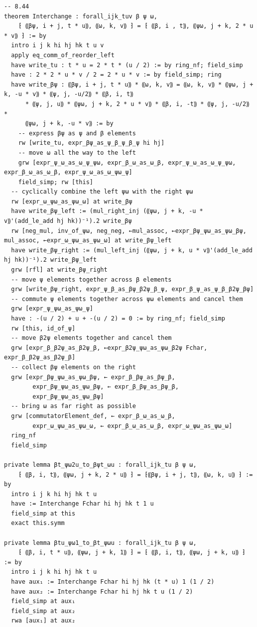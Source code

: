 \begin{Verbatim}
-- 8.44
theorem Interchange : forall_ijk_tuv β ψ ω,
    ⁅ ⸨βψ, i + j, t * u⸩, ⸨ω, k, v⸩ ⁆ = ⁅ ⸨β, i , t⸩, ⸨ψω, j + k, 2 * u * v⸩ ⁆ := by
  intro i j k hi hj hk t u v
  apply eq_comm_of_reorder_left
  have write_tu : t * u = 2 * t * (u / 2) := by ring_nf; field_simp
  have : 2 * 2 * u * v / 2 = 2 * u * v := by field_simp; ring
  have write_βψ : ⸨βψ, i + j, t * u⸩ * ⸨ω, k, v⸩ = ⸨ω, k, v⸩ * ⸨ψω, j + k, -u * v⸩ * ⸨ψ, j, -u/2⸩ * ⸨β, i, t⸩
      * ⸨ψ, j, u⸩ * ⸨ψω, j + k, 2 * u * v⸩ * ⸨β, i, -t⸩ * ⸨ψ, j, -u/2⸩ *
      ⸨ψω, j + k, -u * v⸩ := by
    -- express βψ as ψ and β elements
    rw [write_tu, expr_βψ_as_ψ_β_ψ_β_ψ hi hj]
    -- move ω all the way to the left
    grw [expr_ψ_ω_as_ω_ψ_ψω, expr_β_ω_as_ω_β, expr_ψ_ω_as_ω_ψ_ψω, expr_β_ω_as_ω_β, expr_ψ_ω_as_ω_ψω_ψ]
    field_simp; rw [this]
  -- cyclically combine the left ψω with the right ψω
  rw [expr_ω_ψω_as_ψω_ω] at write_βψ
  have write_βψ_left := (mul_right_inj (⸨ψω, j + k, -u * v⸩'(add_le_add hj hk))⁻¹).2 write_βψ
  rw [neg_mul, inv_of_ψω, neg_neg, ←mul_assoc, ←expr_βψ_ψω_as_ψω_βψ, mul_assoc, ←expr_ω_ψω_as_ψω_ω] at write_βψ_left
  have write_βψ_right := (mul_left_inj (⸨ψω, j + k, u * v⸩'(add_le_add hj hk))⁻¹).2 write_βψ_left
  grw [rfl] at write_βψ_right
  -- move ψ elements together across β elements
  grw [write_βψ_right, expr_ψ_β_as_βψ_β2ψ_β_ψ, expr_β_ψ_as_ψ_β_β2ψ_βψ]
  -- commute ψ elements together across ψω elements and cancel them
  grw [expr_ψ_ψω_as_ψω_ψ]
  have : -(u / 2) + u + -(u / 2) = 0 := by ring_nf; field_simp
  rw [this, id_of_ψ]
  -- move β2ψ elements together and cancel them
  grw [expr_β_β2ψ_as_β2ψ_β, ←expr_β2ψ_ψω_as_ψω_β2ψ Fchar, expr_β_β2ψ_as_β2ψ_β]
  -- collect βψ elements on the right
  grw [expr_βψ_ψω_as_ψω_βψ, ← expr_β_βψ_as_βψ_β,
        expr_βψ_ψω_as_ψω_βψ, ← expr_β_βψ_as_βψ_β,
        expr_βψ_ψω_as_ψω_βψ]
  -- bring ω as far right as possible
  grw [commutatorElement_def, ← expr_β_ω_as_ω_β,
        expr_ω_ψω_as_ψω_ω, ← expr_β_ω_as_ω_β, expr_ω_ψω_as_ψω_ω]
  ring_nf
  field_simp

private lemma βt_ψω2u_to_βψt_ωu : forall_ijk_tu β ψ ω,
    ⁅ ⸨β, i, t⸩, ⸨ψω, j + k, 2 * u⸩ ⁆ = ⁅⸨βψ, i + j, t⸩, ⸨ω, k, u⸩ ⁆ := by
  intro i j k hi hj hk t u
  have := Interchange Fchar hi hj hk t 1 u
  field_simp at this
  exact this.symm

private lemma βtu_ψω1_to_βt_ψωu : forall_ijk_tu β ψ ω,
    ⁅ ⸨β, i, t * u⸩, ⸨ψω, j + k, 1⸩ ⁆ = ⁅ ⸨β, i, t⸩, ⸨ψω, j + k, u⸩ ⁆ := by
  intro i j k hi hj hk t u
  have aux₁ := Interchange Fchar hi hj hk (t * u) 1 (1 / 2)
  have aux₂ := Interchange Fchar hi hj hk t u (1 / 2)
  field_simp at aux₁
  field_simp at aux₂
  rwa [aux₁] at aux₂


\end{Verbatim}
